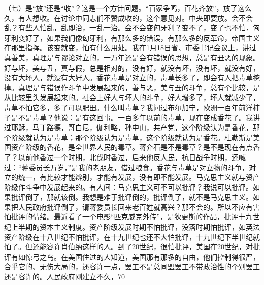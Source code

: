 （七）是“放”还是“收”？这是一个方针问题。“百家争鸣，百花齐放”，放了这么久，有人想收。在讨论中同志们不赞成收的，这个意见对。中央即要放。会不会乱？有些人怕乱，乱即治，一乱一治。会不会变匈牙利？变不了，变了也不怕．匈牙利变好了，如果我们像匈牙利，有那么多的错误，有那么多的反革命，帝国主义在那里指挥。该变就变，怕有什么用处。我在1月18日省、市委书记会议上，讲过真善美，真理是与谬论对立的，一万年还是会有错误的思想，总是有丑恶的现象。好与坏，美与丑，真与假，总是相对的，没有好，就没有坏，没有坏，就没有好，没有大坏人，就没有大好人。香花毒草是对立的，毒草长多了，即会有人把毒草挖掉。真理是与错误作斗争中发展起来的，善与恶，美与丑的斗争，总有个比较，是从比较里头发展起来的。社会上好人与坏人的斗争，好人增多了，坏人就减少了，毒草不怕它多，多了可以肥田。什么叫毒草？我问过布尔加宁，欧洲一百年前洋柿子是不是毒草？他说：是有这回事。一百多年以前的毒草，现在变成香花了。我讲过耶稣，马丁路德，哥白尼，伽利略，孙中山，共产党，这个阶级认为是香花，那个阶级就认为是毒草；那个阶级认为是毒草，这个阶级就认为是香花。杜勒斯是美国资产阶级的香花，是全世界人民的毒草。蒋介石是不是毒草？是不是现在有点香了？以前他香过一个时期，北伐时香过，后来他反人民，抗日战争时期，还喊过：“蒋委员长万岁，”是我的老朋友，借过粮食。香花与毒草是对立物的斗争，对立的统一，有比较才能辨别，才能有发展，没有即不能发展。马克思主义就与资产阶级作斗争中发展起来的。有人间：马克思主义可不可以批评？我说可以批评。如果批评倒了，那就该倒。我想是难于批评倒的，批评倒了，就不是马克思主义。如果把人民政府批评倒了，请蒋委员长回来老百姓就高兴？那不会的。所以不应有害怕批评的情绪。最近看了一个电影“匹克威克外传”，是狄更斯的作品，批评十九世纪上半期的资本主义制度。资产阶级发展时期不怕批评，没落时期怕批评，如英法资产阶级在十八世纪不怕批评，在十九世纪也还不大怕批评，十九世纪下半世纪就怕了。但还能容许肖伯纳这样的人。到了20世纪，很怕批评，美国在20世纪，对批评有如惊弓之鸟。在美国住过的人知道，美国那有那多的自由，他们控制得很严，合乎它的、无伤大局的，还容许一点，罢工不是总同盟罢工不带政治性的个别罢工还是容许的。人民政府刚建立不久，70%